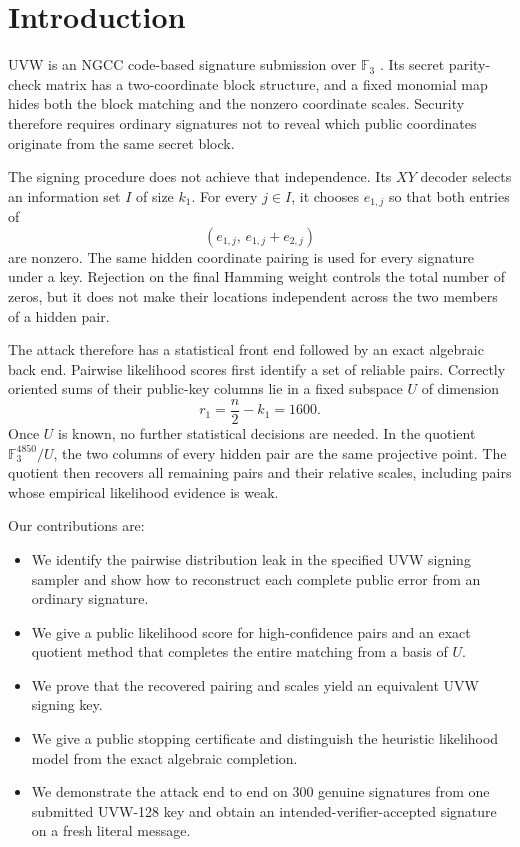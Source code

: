 \documentclass[11pt,a4paper]{article}
\newcommand{\F}{\mathbb{F}}
\begin{document}
\section{Introduction}

UVW is an NGCC code-based signature submission over $\F_3$ \cite{uvw-spec}.
Its secret parity-check matrix has a two-coordinate block structure, and a
fixed monomial map hides both the block matching and the nonzero coordinate
scales.  Security therefore requires ordinary signatures not to reveal which
public coordinates originate from the same secret block.

The signing procedure does not achieve that independence.  Its $XY$ decoder
selects an information set $I$ of size $k_1$.  For every $j\in I$, it chooses $e_{1,j}$
so that both entries of
\[
                   (e_{1,j},\,e_{1,j}+e_{2,j})
\]
are nonzero.  The same hidden coordinate pairing is used for every signature
under a key.  Rejection on the final Hamming weight controls the total number
of zeros, but it does not make their locations independent across the two
members of a hidden pair.

The attack therefore has a statistical front end followed by an exact
algebraic back end.  Pairwise likelihood scores first identify a set of reliable pairs.
Correctly oriented sums of their public-key columns lie in a fixed subspace $U$ of
dimension
\[
                   r_1=\frac n2-k_1=1600.
\]
Once $U$ is known, no further statistical decisions are needed.  In the
quotient $\F_3^{4850}/U$, the two columns of every hidden pair are the same
projective point.  The quotient then recovers all remaining pairs and their
relative scales, including pairs whose empirical likelihood evidence is weak.

Our contributions are:
\begin{itemize}[leftmargin=1.5em]
  \item We identify the pairwise distribution leak in the specified UVW
        signing sampler and show how to reconstruct each complete public
        error from an ordinary signature.
  \item We give a public likelihood score for high-confidence pairs and an
        exact quotient method that completes the entire matching from a
        basis of $U$.
  \item We prove that the recovered pairing and scales yield an equivalent
        UVW signing key.
  \item We give a public stopping certificate and distinguish the heuristic
        likelihood model from the exact algebraic completion.
  \item We demonstrate the attack end to end on 300 genuine signatures from
        one submitted UVW-128 key and obtain an intended-verifier-accepted
        signature on a fresh literal message.
\end{itemize}
\end{document}
